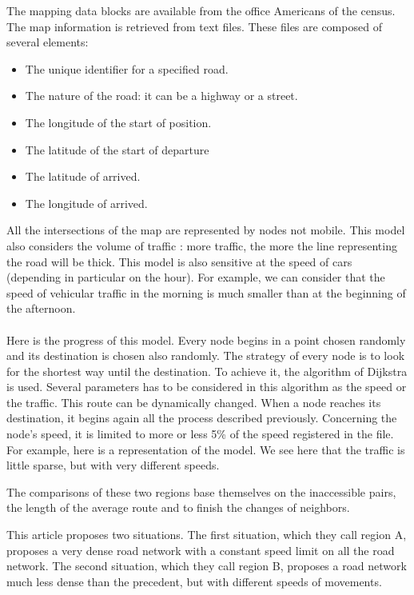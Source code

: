 The mapping data blocks are available from the office Americans of the census. The map information is retrieved from text files. These files are composed of several elements:

\begin{itemize}
\item The unique identifier for a specified road.
\item The nature of the road: it can be a highway or a street.
\item The longitude of the start of position.
\item The latitude of the start of departure
\item The latitude of arrived.
\item The longitude of arrived.
\end{itemize}

All the intersections of the map are represented by nodes not mobile.
This model also considers the volume of traffic : more traffic, the more the line representing the road will be thick.
This model is also sensitive at the speed of cars (depending in particular on the hour). For example, we can consider that the speed of vehicular traffic in the morning is much smaller than at the beginning of the afternoon.\\\\

Here is the progress of this model. Every node begins in a point chosen randomly and its destination is chosen also randomly. The strategy of every node is to look for the shortest way until the destination. To achieve it, the algorithm of Dijkstra is used. Several parameters has to be considered in this algorithm as the speed or the traffic. This route can be dynamically changed. When a node reaches its destination, it begins again all the process described previously. Concerning the node's speed, it is limited to more or less 5\% of the speed registered in the file.\\
For example, here is a representation of the model. We see here that the traffic is little sparse, but with very different speeds.

The comparisons of these two regions base themselves on the inaccessible pairs, the length of the average route and to finish the changes of neighbors.

This article proposes two situations.
The first situation, which they call region A, proposes a very dense road network with a constant speed limit on all the road network.
The second situation, which they call region B, proposes a road network much less dense than the precedent, but with different speeds of movements.

